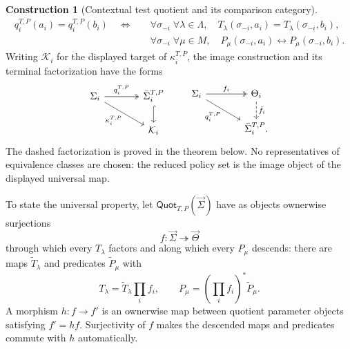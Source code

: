 \documentclass[11pt,a4paper]{article}
\numberwithin{equation}{section}
\theoremstyle{definition}
\newtheorem{construction}[construction]{Construction}
\theoremstyle{remark}
\theoremstyle{plain}
\begin{document}
\begin{construction}[Contextual test quotient and its comparison category]
\begin{equation}
\label{eq:egt-test-equivalence}
\begin{split}
 q_i^{T,P}(a_i)=q_i^{T,P}(b_i)
 \quad\Longleftrightarrow\quad
 &\forall\sigma_{-i}\;\forall\lambda\in\Lambda,
 \quad
 T_\lambda(\sigma_{-i},a_i)=T_\lambda(\sigma_{-i},b_i),\\
 &\forall\sigma_{-i}\;\forall\mu\in M,
 \quad
 P_\mu(\sigma_{-i},a_i)\leftrightarrow
 P_\mu(\sigma_{-i},b_i).
\end{split}
\end{equation}
Writing $\mathcal K_i$ for the displayed target of $\kappa_i^{T,P}$,
the image construction and its terminal factorization have the forms
\[
\begin{tikzcd}[column sep=large]
 \Sigma_i\arrow[r,two heads,"q_i^{T,P}"]
 \arrow[dr,"\kappa_i^{T,P}"']&
 \bar\Sigma_i^{T,P}\arrow[d,hook]\\
 &\mathcal K_i
\end{tikzcd}
\qquad
\begin{tikzcd}[column sep=large]
 \Sigma_i\arrow[r,two heads,"f_i"]
 \arrow[dr,"q_i^{T,P}"']&\Theta_i\arrow[d,dashed,"\bar f_i"]\\
 &\bar\Sigma_i^{T,P}.
\end{tikzcd}
\]
The dashed factorization is proved in the theorem below.
No representatives of equivalence classes are chosen: the reduced policy set
is the image object of the displayed universal map.

To state the universal property, let $\mathsf{Quot}_{T,P}(\vec\Sigma)$ have
as objects ownerwise surjections
\[
 f:\vec\Sigma\twoheadrightarrow\vec\Theta
\]
through which every $T_\lambda$ factors and along which every $P_\mu$
descends: there are maps $\widetilde T_\lambda$ and predicates
$\widetilde P_\mu$ with
\[
 T_\lambda=\widetilde T_\lambda\prod_i f_i,
 \qquad
 P_\mu=\left(\prod_i f_i\right)^*\widetilde P_\mu.
\]
A morphism $h:f\to f'$ is an ownerwise map between quotient parameter
objects satisfying $f'=hf$. Surjectivity of $f$ makes the descended maps and
predicates commute with $h$ automatically.
\end{construction}
\end{document}
